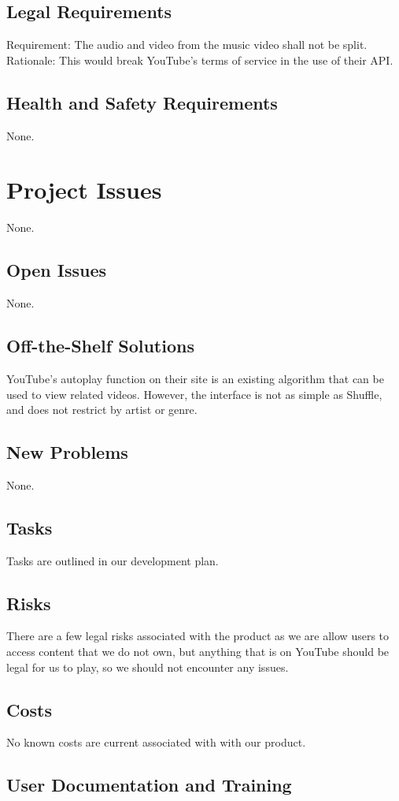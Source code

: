 \documentclass[12pt, titlepage]{article}
\begin{document}
\subsection{Legal Requirements}
Requirement: The audio and video from the music video shall not be split.\\
Rationale: This would break YouTube's terms of service in the use of their API.
\subsection{Health and Safety Requirements}
None.
\section{Project Issues}
None.
\subsection{Open Issues}
None.
\subsection{Off-the-Shelf Solutions}
YouTube's autoplay function on their site is an existing algorithm that can be used to view related videos.  However, the interface is not as simple as Shuffle, and does not restrict by artist or genre.
\subsection{New Problems}
None.
\subsection{Tasks}
Tasks are outlined in our development plan.
\subsection{Risks}
There are a few legal risks associated with the product as we are allow users to access content that we do not own, but anything that is on YouTube should be legal for us to play, so we should not encounter any issues.
\subsection{Costs}

No known costs are current associated with with our product.

\subsection{User Documentation and Training}
\end{document}
